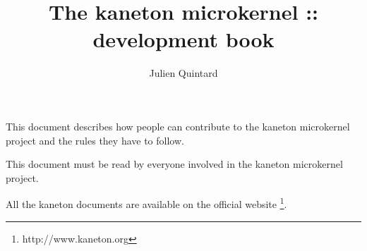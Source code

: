 %
%
%
%
%
%

%
%

\def\path{../..}

%
%



%
%

\rhead{}

%
%

\title{The kaneton microkernel :: development book
       \logos}

%
%

\author{\small{Julien Quintard}}

%
%



%
%

\maketitle

%
%

This document describes how people can contribute to the kaneton microkernel
project and the rules they have to follow.

This document must be read by everyone involved in the kaneton microkernel
project.

All the kaneton documents are available on
the official website
  \footnote{http://www.kaneton.org}.

%
%

\tableofcontents

%
%






%
%
%

%
%



%
%

